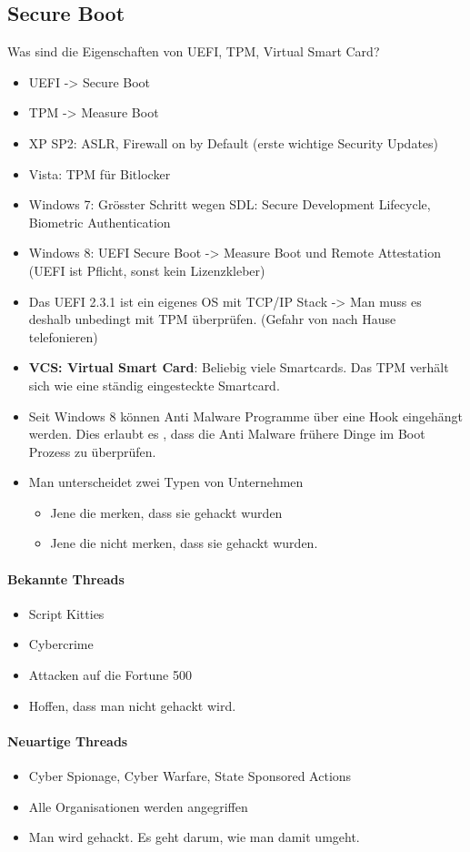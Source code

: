 \subsection{Secure Boot}
Was sind die Eigenschaften von UEFI, TPM, Virtual Smart Card?
\begin{itemize}
	\item UEFI -> Secure Boot
	\item TPM -> Measure Boot 
	\item XP SP2: ASLR, Firewall on by Default (erste wichtige Security Updates)
	\item Vista: TPM für Bitlocker
	\item Windows 7: Grösster Schritt wegen SDL: Secure Development Lifecycle, Biometric Authentication
	\item Windows 8: UEFI Secure Boot -> Measure Boot und Remote Attestation (UEFI ist Pflicht, sonst kein Lizenzkleber)
	\item Das UEFI 2.3.1 ist ein eigenes OS mit TCP/IP Stack -> Man muss es deshalb unbedingt mit TPM überprüfen. (Gefahr von nach Hause telefonieren)
	\item \textbf{VCS: Virtual Smart Card}: Beliebig viele Smartcards. Das TPM verhält sich wie eine ständig eingesteckte Smartcard.
	\item Seit Windows 8 können Anti Malware Programme über eine Hook eingehängt werden. Dies erlaubt es , dass die Anti Malware frühere Dinge im Boot Prozess zu überprüfen.
	\item Man unterscheidet zwei Typen von Unternehmen
	\begin{itemize}
		\item Jene die merken, dass sie gehackt wurden
		\item Jene die nicht merken, dass sie gehackt wurden.
	\end{itemize}
\end{itemize}

\paragraph{Bekannte Threads}
\begin{itemize}
	\item Script Kitties
	\item Cybercrime
	\item Attacken auf die Fortune 500
	\item Hoffen, dass man nicht gehackt wird.
\end{itemize}

\paragraph{Neuartige Threads}
\begin{itemize}
	\item Cyber Spionage, Cyber Warfare, State Sponsored Actions
	\item Alle Organisationen werden angegriffen
	\item Man wird gehackt. Es geht darum, wie man damit umgeht.
\end{itemize}




 